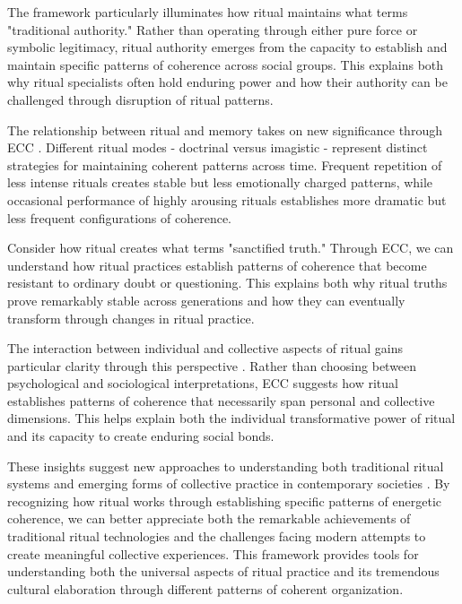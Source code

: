 The framework particularly illuminates how ritual maintains what \cite{bloch1989ritual} terms "traditional authority." Rather than operating through either pure force or symbolic legitimacy, ritual authority emerges from the capacity to establish and maintain specific patterns of coherence across social groups. This explains both why ritual specialists often hold enduring power and how their authority can be challenged through disruption of ritual patterns.

The relationship between ritual and memory takes on new significance through ECC \cite{whitehouse2004modes}. Different ritual modes - doctrinal versus imagistic - represent distinct strategies for maintaining coherent patterns across time. Frequent repetition of less intense rituals creates stable but less emotionally charged patterns, while occasional performance of highly arousing rituals establishes more dramatic but less frequent configurations of coherence.

Consider how ritual creates what \cite{rappaport1999ritual} terms "sanctified truth." Through ECC, we can understand how ritual practices establish patterns of coherence that become resistant to ordinary doubt or questioning. This explains both why ritual truths prove remarkably stable across generations and how they can eventually transform through changes in ritual practice.

The interaction between individual and collective aspects of ritual gains particular clarity through this perspective \cite{collins2004interaction}. Rather than choosing between psychological and sociological interpretations, ECC suggests how ritual establishes patterns of coherence that necessarily span personal and collective dimensions. This helps explain both the individual transformative power of ritual and its capacity to create enduring social bonds.

These insights suggest new approaches to understanding both traditional ritual systems and emerging forms of collective practice in contemporary societies \cite{bloch1989ritual}. By recognizing how ritual works through establishing specific patterns of energetic coherence, we can better appreciate both the remarkable achievements of traditional ritual technologies and the challenges facing modern attempts to create meaningful collective experiences. This framework provides tools for understanding both the universal aspects of ritual practice and its tremendous cultural elaboration through different patterns of coherent organization.

